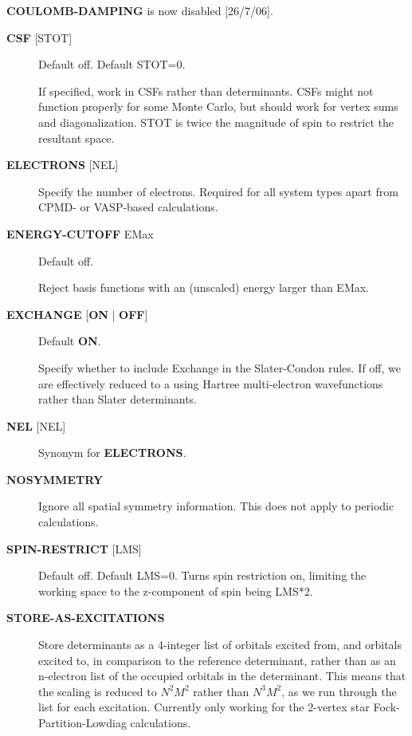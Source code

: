 \documentclass[openany,a4paper,10pt]{manual}
\begin{document}
\begin{notice}[note]
\textbf{COULOMB-DAMPING} is now disabled {[}26/7/06{]}.
\end{notice}
\begin{description}
\item[\textbf{CSF} {[}STOT{]}]
Default off.  Default STOT=0.

If specified, work in CSFs rather than determinants.  CSFs might not
function properly for some Monte Carlo, but should work for vertex
sums and diagonalization.   STOT is twice the magnitude of spin to
restrict the resultant space.

\item[\textbf{ELECTRONS} {[}NEL{]}]
Specify the number of electrons.  Required for all system types
apart from CPMD- or VASP-based  calculations.

\item[\textbf{ENERGY-CUTOFF} EMax]
Default off.

Reject basis functions with an (unscaled) energy larger than EMax.

\item[\textbf{EXCHANGE} {[}\textbf{ON} | \textbf{OFF}{]}]
Default \textbf{ON}.

Specify whether to include Exchange in the Slater-Condon rules.
If off, we are effectively reduced to a using Hartree multi-electron
wavefunctions rather than Slater determinants.

\item[\textbf{NEL} {[}NEL{]}]
Synonym for \textbf{ELECTRONS}.

\item[\textbf{NOSYMMETRY}]
Ignore all spatial symmetry information. This does not apply to
periodic calculations.

\item[\textbf{SPIN-RESTRICT} {[}LMS{]}]
Default off.  Default LMS=0.  Turns spin restriction on, limiting
the working space to the z-component of spin being LMS*2.

\item[\textbf{STORE-AS-EXCITATIONS}]
Store determinants as a 4-integer list of orbitals excited from, and
orbitals excited to, in comparison to the reference determinant,
rather than as an n-electron list of the occupied orbitals
in the determinant. This means that the scaling is reduced to
$N^2M^2$ rather than $N^3M^2$, as we run through the
list for each excitation.  Currently only working for the 2-vertex
star Fock-Partition-Lowdiag calculations.


\end{description}
\end{document}
